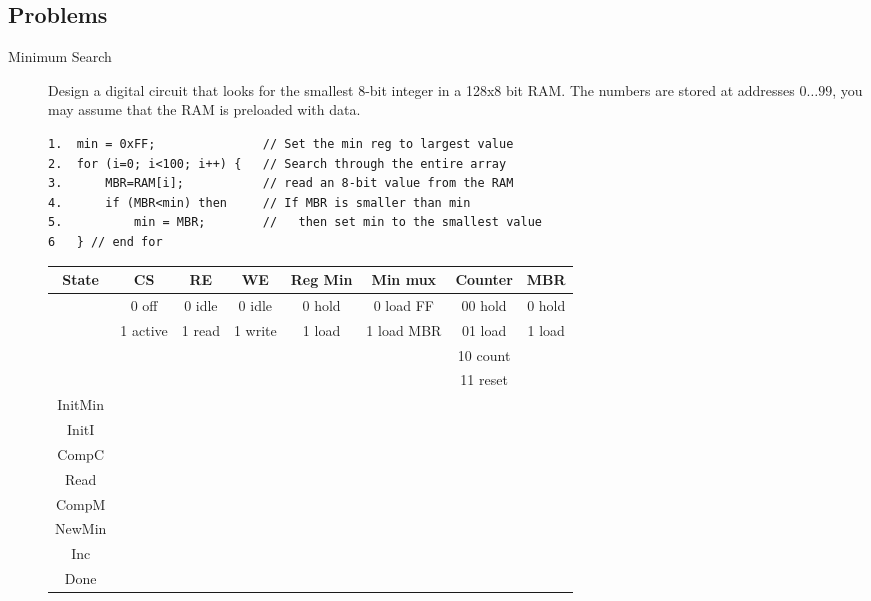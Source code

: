 \subsection{Problems}
\begin{description}


\item[Minimum Search]

Design a digital circuit that looks for the smallest 
8-bit integer in a 128x8 bit RAM.  The numbers
are stored at addresses $0\ldots 99$, you may assume that the 
RAM is preloaded with data.

\begin{verbatim}
1.  min = 0xFF;               // Set the min reg to largest value
2.  for (i=0; i<100; i++) {   // Search through the entire array
3.      MBR=RAM[i];           // read an 8-bit value from the RAM
4.      if (MBR<min) then     // If MBR is smaller than min
5.          min = MBR;        //   then set min to the smallest value
6   } // end for
\end{verbatim}




\begin{tabular}{c||c|c|c|c|c|c|c}  
State   & CS       & RE     &  WE      &  Reg Min  & Min mux       & Counter & MBR	\\ \hline
        & 0 off    & 0 idle & 0 idle   &  0 hold   & 0 load FF     & 00 hold & 0 hold	\\ \hline
        & 1 active & 1 read & 1 write  &  1 load   & 1 load MBR    & 01 load & 1 load	\\ \hline
        &          &       &           &           &               & 10 count& 		\\ \hline
        &          &       &           &           &               & 11 reset& \\ \hline \hline
InitMin &         &      &          &          &              &       &    \\ \hline
InitI   &         &      &          &          &              &       &    \\ \hline
CompC   &         &      &          &          &              &       &    \\ \hline
Read    &         &      &          &          &              &       &    \\ \hline
CompM   &         &      &          &          &              &       &    \\ \hline
NewMin  &         &      &          &          &              &       &    \\ \hline
Inc     &         &      &          &          &              &       &    \\ \hline
Done    &         &      &          &          &              &       &    \\ 
\end{tabular}


\end{description}
